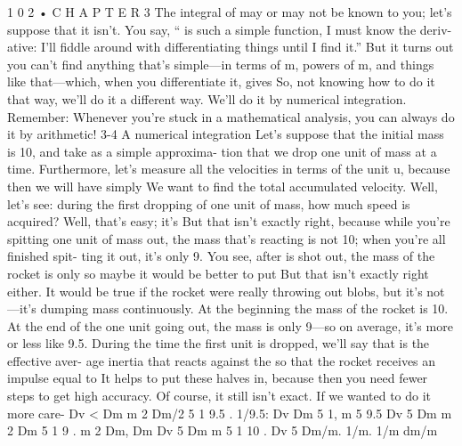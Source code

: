 \documentclass[10pt,oneside]{article}
\begin{document}
1 0 2 • C H A P T E R  3 The integral of may or may not be known to you; let’s suppose that it isn’t. You say, “ is such a simple function, I must know the deriv- ative: I’ll fiddle around with differentiating things until I find it.” But it turns out you can’t find anything that’s simple---in terms of m, powers of m, and things like that---which, when you differentiate it, gives So, not knowing how to do it that way, we’ll do it a different way. We’ll do it by numerical integration. Remember: Whenever you’re stuck in a mathematical analysis, you can always do it by arithmetic! 3-4 A numerical integration Let’s suppose that the initial mass is 10, and take as a simple approxima- tion that we drop one unit of mass at a time. Furthermore, let’s measure all the velocities in terms of the unit u, because then we will have simply We want to find the total accumulated velocity. Well, let’s see: during the first dropping of one unit of mass, how much speed is acquired? Well, that’s easy; it’s But that isn’t exactly right, because while you’re spitting one unit of mass out, the mass that’s reacting is not 10; when you’re all finished spit- ting it out, it’s only 9. You see, after is shot out, the mass of the rocket is only so maybe it would be better to put But that isn’t exactly right either. It would be true if the rocket were really throwing out blobs, but it’s not---it’s dumping mass continuously. At the beginning the mass of the rocket is 10. At the end of the one unit going out, the mass is only 9---so on average, it’s more or less like 9.5. During the time the first unit is dropped, we’ll say that is the effective aver- age inertia that reacts against the so that the rocket receives an impulse equal to It helps to put these halves in, because then you need fewer steps to get high accuracy. Of course, it still isn’t exact. If we wanted to do it more care- Dv < Dm m 2 Dm/2 5 1 9.5 . 1/9.5: Dv Dm 5 1, m 5 9.5 Dv 5 Dm m 2 Dm 5 1 9 . m 2 Dm, Dm Dv 5 Dm m 5 1 10 . Dv 5 Dm/m. 1/m. 1/m dm/m\par
\end{document}
